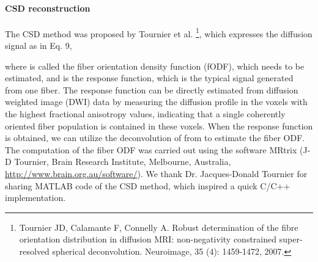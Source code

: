 \documentclass[letterpaper,10pt,english]{sphinxmanual}
\begin{document}
\paragraph{CSD reconstruction}
\label{userguide:csd-reconstruction}
The CSD method was proposed by Tournier et al. \footnote{
Tournier JD, Calamante F, Connelly A. Robust determination of the fibre orientation distribution in diffusion MRI: non-negativity constrained super-resolved spherical deconvolution. Neuroimage, 35 (4): 1459-1472, 2007.
}, which expresses the diffusion signal as in Eq. 9,

where  is called the fiber orientation density function (fODF), which needs to be estimated, and  is the response function, which is the typical signal generated from one fiber. The response function can be directly estimated from diffusion weighted image (DWI) data by measuring the diffusion profile in the voxels with the highest fractional anisotropy values, indicating that a single coherently oriented fiber population is contained in these voxels. When the response function is obtained, we can utilize the deconvolution of  from  to estimate the fiber ODF. The computation of the fiber ODF was carried out using the software MRtrix (J-D Tournier, Brain Research Institute, Melbourne, Australia, \href{http://www.brain.org.au/software/}{http://www.brain.org.au/software/}). We thank Dr. Jacques-Donald Tournier for sharing MATLAB code of the CSD method, which inspired a quick C/C++ implementation.
\end{document}
